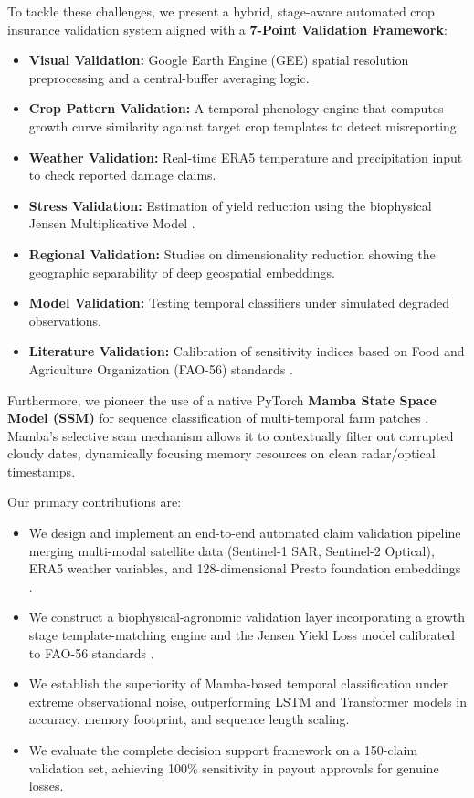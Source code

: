 \documentclass[conference]{IEEEtran}
\begin{document}
To tackle these challenges, we present a hybrid, stage-aware automated crop insurance validation system aligned with a \textbf{7-Point Validation Framework}:
\begin{itemize}
\item \textbf{Visual Validation:} Google Earth Engine (GEE) spatial resolution preprocessing and a central-buffer averaging logic.
\item \textbf{Crop Pattern Validation:} A temporal phenology engine that computes growth curve similarity against target crop templates to detect misreporting.
\item \textbf{Weather Validation:} Real-time ERA5 temperature and precipitation input to check reported damage claims.
\item \textbf{Stress Validation:} Estimation of yield reduction using the biophysical Jensen Multiplicative Model \cite{b5}.
\item \textbf{Regional Validation:} Studies on dimensionality reduction showing the geographic separability of deep geospatial embeddings.
\item \textbf{Model Validation:} Testing temporal classifiers under simulated degraded observations.
\item \textbf{Literature Validation:} Calibration of sensitivity indices based on Food and Agriculture Organization (FAO-56) standards \cite{b4}.
\end{itemize}

Furthermore, we pioneer the use of a native PyTorch \textbf{Mamba State Space Model (SSM)} for sequence classification of multi-temporal farm patches \cite{b3}. Mamba's selective scan mechanism allows it to contextually filter out corrupted cloudy dates, dynamically focusing memory resources on clean radar/optical timestamps.

Our primary contributions are:
\begin{itemize}
\item We design and implement an end-to-end automated claim validation pipeline merging multi-modal satellite data (Sentinel-1 SAR, Sentinel-2 Optical), ERA5 weather variables, and 128-dimensional Presto foundation embeddings \cite{b2}.
\item We construct a biophysical-agronomic validation layer incorporating a growth stage template-matching engine and the Jensen Yield Loss model calibrated to FAO-56 standards \cite{b4}.
\item We establish the superiority of Mamba-based temporal classification under extreme observational noise, outperforming LSTM and Transformer models in accuracy, memory footprint, and sequence length scaling.
\item We evaluate the complete decision support framework on a 150-claim validation set, achieving 100\% sensitivity in payout approvals for genuine losses.
\end{itemize}
\end{document}
